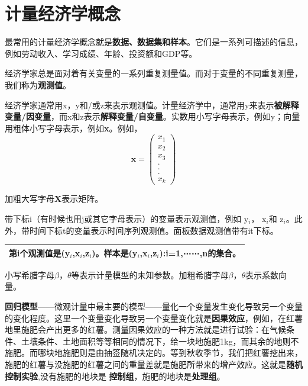 \documentclass[cn,12pt,math=newtx,citestyle=gb7714-2015,bibstyle=gb7714-2015]{elegantbook}
\begin{document}
	\section{计量经济学概念}
	\begin{flushleft}
		最常用的计量经济学概念就是\textbf{数据、数据集和样本}。它们是一系列可描述的信息，例如劳动收入、学习成绩、年龄、投资额和GDP等。
		
		经济学家总是面对着有关变量的一系列重复测量值。而对于变量的不同重复测量，我们称为\textbf{观测值}。
		
		经济学家通常用x，y和/或z来表示观测值。计量经济学中，通常用y来表示\textbf{被解释变量/因变量}，而x和z表示\textbf{解释变量/自变量}。实数用小写字母表示，例如y；向量用粗体小写字母表示，例如\textbf{x}。例如，
		\begin{equation}
			\textbf{x}=
			\left(
			\begin{array}{c}
				x_1\\
				x_2\\
				x_3\\
				.\\
				.\\
				.\\
				x_k
			\end{array}
			\right)
		\end{equation}
		
		加粗大写字母\textbf{X}表示矩阵。
		
		带下标i（有时候也用j或其它字母表示）的变量表示观测值，例如
		y$_i$，
		x$_i$和
		z$_i$。此外，带时间下标t的变量表示时间序列观测值。面板数据观测值带有it下标。
		
		\begin{center}
			\begin{tabular}{|l|}
				\hline
				第i个\textbf{观测值}是(y$_i$,x$_i$,z$_i$)。样本是{(y$_i$,x$_i$,z$_i$):i=1,⋯⋯,n}的集合。\\
				\hline
			\end{tabular}
		\end{center}
		
		小写希腊字母$\beta$，$\theta$等表示计量模型的未知参数。加粗希腊字母\textbf{$\beta$}，\textbf{$\theta$}表示系数向量。
		
		\textbf{回归模型}——微观计量中最主要的模型——量化一个变量发生变化导致另一个变量的变化程度。这里一个变量变化导致另一个变量变化就是\textbf{因果效应}，例如，在红薯地里施肥会产出更多的红薯。测量因果效应的一种方法就是进行试验：在气候条件、土壤条件、土地面积等等相同的情况下，给一块地施肥1kg，而其余的地则不施肥。而哪块地施肥则是由抽签随机决定的。等到秋收季节，我们把红薯挖出来，施肥的红薯与没施肥的红薯之间的重量差就是施肥所带来的增产效应。这就是\textbf{随机控制实验},没有施肥的地块是
		\textbf{控制组}，施肥的地块是\textbf{处理组}。
	\end{flushleft}
\end{document}

